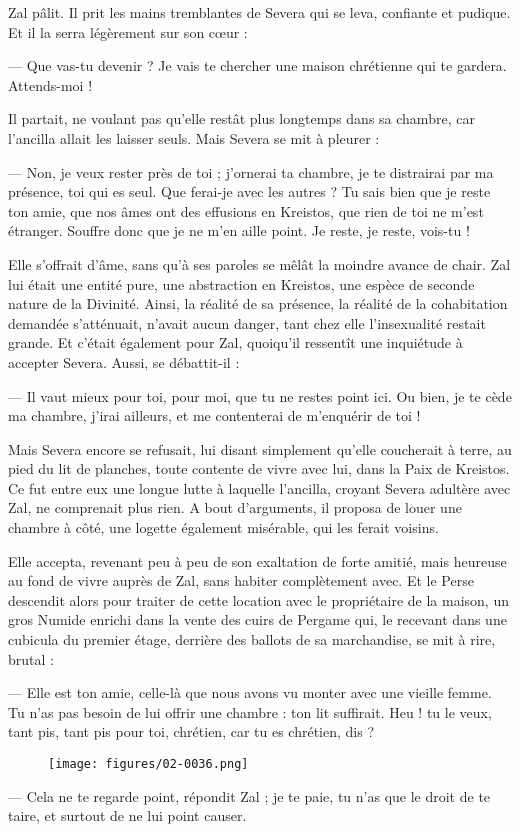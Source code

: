 \documentclass[a4paper, 11pt, oneside, polutonikogreek, french]{article}
\begin{document}
Zal pâlit. Il prit les mains tremblantes de Severa qui se leva, confiante et pudique. Et il la serra légèrement sur son cœur :

--- Que vas-tu devenir ? Je vais te chercher une maison chrétienne qui te gardera. Attends-moi !

Il partait, ne voulant pas qu'elle restât plus longtemps dans sa chambre, car l'ancilla allait les laisser seuls. Mais Severa se mit à pleurer :

--- Non, je veux rester près de toi ; j'ornerai ta chambre, je te distrairai par ma présence, toi qui es seul. Que ferai-je avec les autres ? Tu sais bien que je reste ton amie, que nos âmes ont des effusions en Kreistos, que rien de toi ne m'est étranger. Souffre donc que je ne m'en aille point. Je reste, je reste, vois-tu !

Elle s'offrait d'âme, sans qu'à ses paroles se mêlât la moindre avance de chair. Zal lui était une entité pure, une abstraction en Kreistos, une espèce de seconde nature de la Divinité. Ainsi, la réalité de sa présence, la réalité de la cohabitation demandée s'atténuait, n'avait aucun danger, tant chez elle l'insexualité restait grande. Et c'était également pour Zal, quoiqu'il ressentît une inquiétude à accepter Severa. Aussi, se débattit-il :

--- Il vaut mieux pour toi, pour moi, que tu ne restes point ici. Ou bien, je te cède ma chambre, j'irai ailleurs, et me contenterai de m'enquérir de toi !

Mais Severa encore se refusait, lui disant simplement qu'elle coucherait à terre, au pied du lit de planches, toute contente de vivre avec lui, dans la Paix de Kreistos. Ce fut entre eux une longue lutte à laquelle l'ancilla, croyant Severa adultère avec Zal, ne comprenait plus rien. A bout d'arguments, il proposa de louer une chambre à côté, une logette également misérable, qui les ferait voisins.

Elle accepta, revenant peu à peu de son exaltation de forte amitié, mais heureuse au fond de vivre auprès de Zal, sans habiter complètement avec. Et le Perse descendit alors pour traiter de cette location avec le propriétaire de la maison, un gros Numide enrichi dans la vente des cuirs de Pergame qui, le recevant dans une cubicula du premier étage, derrière des ballots de sa marchandise, se mit à rire, brutal :

--- Elle est ton amie, celle-là que nous avons vu monter avec une vieille femme. Tu n'as pas besoin de lui offrir une chambre : ton lit suffirait. Heu ! tu le veux, tant pis, tant pis pour toi, chrétien, car tu es chrétien, dis ?
\begin{figure}[H]
\centering
\texttt{[image: figures/02-0036.png]}
\end{figure}
--- Cela ne te regarde point, répondit Zal ; je te paie, tu n'as que le droit de te taire, et surtout de ne lui point causer.
\end{document}
